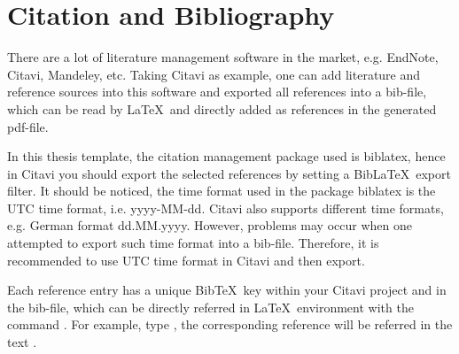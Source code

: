 \chapter{Citation and Bibliography}

\graphicspath{ {graphics/Chapter5/} }

There are a lot of literature management software in the market, e.g. EndNote, Citavi, Mandeley, etc. Taking Citavi as example, one can add literature and reference sources into this software and exported all references into a bib-file, which can be read by \LaTeX~and directly added as references in the generated pdf-file.
	
In this thesis template, the citation management package used is {\color{blue}biblatex}, hence in Citavi you should export the selected references by setting a Bib\LaTeX~export filter. It should be noticed, the time format used in the package {\color{blue}biblatex} is the \gls{UTC} time format, i.e. \colorbox{yellow!60}{yyyy-MM-dd}. Citavi also supports different time formats, e.g. German format \colorbox{yellow!60}{dd.MM.yyyy}. However, problems may occur when one attempted to export such time format into a bib-file. Therefore, it is recommended to use \acrshort{UTC} time format in Citavi and then export.
	
Each reference entry has a unique Bib\TeX~key within your Citavi project and in the bib-file, which can be directly referred in \LaTeX~environment with the command {\color{blue}{\verb|\cite|}}. For example, type {}, the corresponding reference will be referred in the text \cite{Burger.20180508}.
